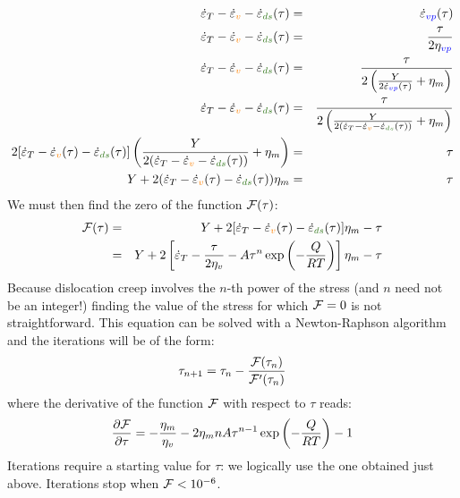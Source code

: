 \begin{enumerate}
\begin{eqnarray}
\dot\varepsilon_T 
-\dot{\varepsilon}_{\color{orange}v} 
-\dot{\varepsilon}_{\color{OliveGreen}ds}(\tau) 
&=& \dot\varepsilon_{\color{blue}vp}(\tau)  \nonumber\\
\dot\varepsilon_T 
-\dot{\varepsilon}_{\color{orange}v} 
-\dot{\varepsilon}_{\color{OliveGreen}ds}(\tau) 
&=& \frac{\tau}{2 \eta_{\color{blue}vp}}  \nn\\
\dot\varepsilon_T 
-\dot{\varepsilon}_{\color{orange}v} 
-\dot{\varepsilon}_{\color{OliveGreen}ds}(\tau) 
&=& \frac{\tau}{2 \left( \frac{Y}{2\dot\varepsilon_{\color{blue}vp}(\tau)} + \eta_m  \right)} 
\nonumber\\
\dot\varepsilon_T 
-\dot{\varepsilon}_{\color{orange}v} 
-\dot{\varepsilon}_{\color{OliveGreen}ds}(\tau) 
&=&
\frac{\tau}{2 \left( \frac{Y}{2 (
\dot\varepsilon_T 
-\dot{\varepsilon}_{\color{orange}v}   
-\dot{\varepsilon}_{\color{OliveGreen}ds}(\tau)  )} + \eta_m  \right)} \nonumber 
\\
2 [
\dot\varepsilon_T 
-\dot{\varepsilon}_{\color{orange}v}(\tau) 
-\dot{\varepsilon}_{\color{OliveGreen}ds}(\tau)
]
\left( \frac{Y}{2 (
\dot\varepsilon_T 
-\dot{\varepsilon}_{\color{orange}v} 
-\dot{\varepsilon}_{\color{OliveGreen}ds}(\tau) )} + \eta_m  \right) &=& \tau 
\nonumber\\
Y + 2 (
\dot\varepsilon_T 
-\dot{\varepsilon}_{\color{orange}v}(\tau)  
-\dot{\varepsilon}_{\color{OliveGreen}ds}(\tau) ) \eta_m  &=& \tau \nonumber 
\end{eqnarray}
We must then find the zero of the function ${\cal F}(\tau)$: 
\begin{eqnarray}
{\cal F}(\tau) 
&=& Y + 2 [
\dot\varepsilon_T 
-\dot{\varepsilon}_{\color{orange}v}(\tau)   
-\dot{\varepsilon}_{\color{OliveGreen}ds}(\tau) 
]\eta_m -\tau \nonumber\\
&=& Y + 2 \left[ 
\dot\varepsilon_T -\frac{\tau}{2\eta_v} -A \tau^n \exp \left(-\frac{Q}{RT}\right) 
\right]\eta_m -\tau \nn
\end{eqnarray}
Because dislocation creep involves the $n$-th power of the stress (and $n$ need not be an integer!) 
finding the value of the stress for which ${\cal F}=0$ is not straightforward.
This equation can be solved with a Newton-Raphson algorithm
and the iterations will be of the form:
\[
\tau_{n+1} = \tau_n - \frac{{\cal F}(\tau_n)}{{\cal F}'(\tau_n)}
\]
where the derivative of the function ${\cal F}$ with respect to $\tau$ reads:
\begin{eqnarray}
\frac{\partial {\cal F}}{\partial \tau} 
= -\frac{\eta_m}{\eta_v}-2 \eta_m n A \tau^{n-1} \exp \left(-\frac{Q}{RT}\right) -1 
\end{eqnarray}
Iterations require a starting value for $\tau$: we logically use the one obtained just 
above. Iterations stop when ${\cal F}<10^{-6}$.  


\end{enumerate}
